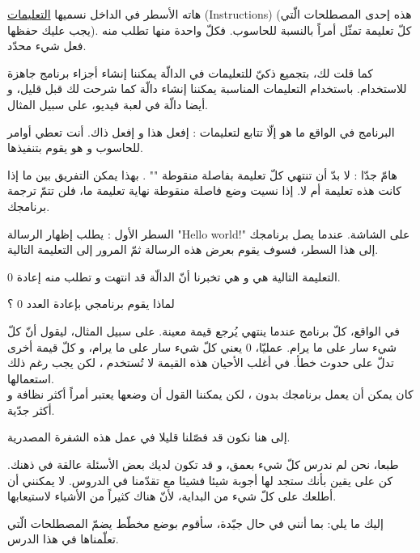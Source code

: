 هاته الأسطر في الداخل نسميها
\underline{التعليمات}
(\textenglish{Instructions})
 (هذه إحدى المصطلحات الّتي يجب عليك حفظها). كلّ تعليمة تمثّل أمراً بالنسبة للحاسوب. فكلّ واحدة منها تطلب منه فعل شيء محدّد.

 كما قلت لك، بتجميع ذكيّ للتعليمات في الدالّة يمكننا إنشاء أجزاء برنامج جاهزة للاستخدام. باستخدام التعليمات المناسبة يمكننا إنشاء دالّة
 كما شرحت لك قبل قليل، و أيضا دالّة
 في لعبة فيديو، على سبيل المثال.

 البرنامج في الواقع ما هو إلّا تتابع لتعليمات : إفعل هذا و إفعل ذاك. أنت تعطي أوامر للحاسوب و هو يقوم بتنفيذها.

 \begin{critical}
هامّ جدّا : لا بدّ أن تنتهي كلّ تعليمة بفاصلة منقوطة
"\InlineCode{;}"
. بهذا يمكن التفريق بين ما إذا كانت هذه تعليمة أم لا. إذا نسيت وضع فاصلة منقوطة نهاية تعليمة ما، فلن تتمّ ترجمة برنامجك.
 \end{critical}

 السطر الأول :
 يطلب إظهار الرسالة
 "\textenglish{Hello world!}"
  على الشاشة. عندما يصل برنامجك إلى هذا السطر، فسوف يقوم بعرض هذه الرسالة ثمّ المرور إلى التعليمة التالية.

  التعليمة التالية هي
 و هي تخبرنا أنّ الدالّة
 قد انتهت و تطلب منه إعادة 0.

 \begin{question}
   لماذا يقوم برنامجي بإعادة العدد 0 ؟
 \end{question}

 في الواقع، كلّ برنامج عندما ينتهي يُرجع قيمة معينة. على سبيل المثال، ليقول أنّ كلّ شيء سار على ما يرام. عمليّا، 0 يعني كلّ شيء سار على ما يرام، و كلّ قيمة أخرى تدلّ على حدوث خطأ. في أغلب الأحيان هذه القيمة لا تُستخدم ، لكن يجب رغم ذلك استعمالها.\\
 كان يمكن أن يعمل برنامجك بدون
، لكن يمكننا القول أن وضعها يعتبر أمراً أكثر نظافة و أكثر جدّية.

إلى هنا نكون قد فصّلنا قليلا في عمل هذه الشفرة المصدرية.

طبعا، نحن لم ندرس كلّ شيء بعمق، و قد تكون لديك بعض الأسئلة عالقة في ذهنك. كن على يقين بأنك ستجد لها أجوبة شيئا فشيئا مع تقدّمنا في الدروس. لا يمكنني أن أطلعك على كلّ شيء من البداية، لأنّ هناك كثيراً من الأشياء لاستيعابها.

إليك ما يلي: بما أنني في حال جيّدة، سأقوم بوضع مخطّط يضمّ المصطلحات الّتي تعلّمناها في هذا الدرس.

